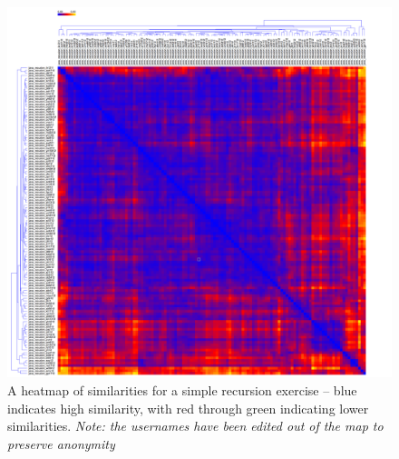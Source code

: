\begin{figure}[H]

	\centering
		\includegraphics[width=1.2\textwidth]{Figures/RecursionHeatmap}
	\caption{A heatmap of similarities for a simple recursion exercise -- blue
	indicates high similarity, with red through green indicating lower
	similarities. \emph{Note: the usernames have been edited out of the map
	to preserve anonymity}}
	\label{fig:recursionHeatmap}

\end{figure}

